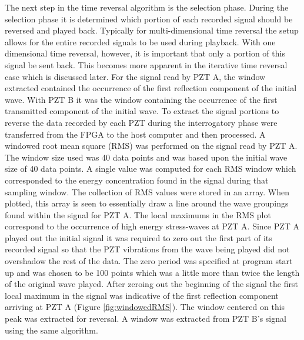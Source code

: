 The next step in the time reversal algorithm is the selection phase. During the selection phase it is determined which portion of each recorded signal should be reversed and played back. Typically for multi-dimensional time reversal the setup allows for the entire recorded signals to be used during playback. With one dimensional time reversal, however, it is important that only a portion of this signal be sent back. This becomes more apparent in the iterative time reversal case which is discussed later. For the signal read by PZT A, the window extracted contained the occurrence of the first reflection component of the initial wave. With PZT B it was the window containing the occurrence of the first transmitted component of the initial wave. To extract the signal portions to reverse the data recorded by each PZT during the interrogatory phase were transferred from the FPGA to the host computer and then processed. A windowed root mean square (RMS) was performed on the signal read by PZT A. The window size used was 40 data points and was based upon the initial wave size of 40 data points. A single value was computed for each RMS window which corresponded to the energy concentration found in the signal during that sampling window. The collection of RMS values were stored in an array. When plotted, this array is seen to essentially draw a line around the wave groupings found within the signal for PZT A. The local maximums in the RMS plot correspond to the occurrence of high energy stress-waves at PZT A. Since PZT A played out the initial signal it was required to zero out the first part of its recorded signal so that the PZT vibrations from the wave being played did not overshadow the rest of the data. The zero period was specified at program start up and was chosen to be 100 points which was a little more than twice the length of the original wave played. After zeroing out the beginning of the signal the first local maximum in the signal was indicative of the first reflection component arriving at PZT A (Figure \ref{fig:windowedRMS}). The window centered on this peak was extracted for reversal. A window was extracted from PZT B's signal using the same algorithm.


